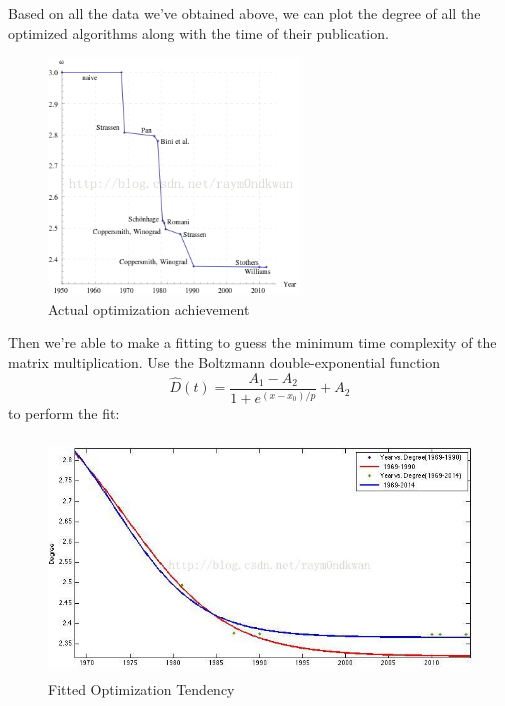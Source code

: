 \documentclass[UTF8]{ctexart}
\begin{document}
Based on all the data we've obtained above, we can plot the degree of all the optimized algorithms along with the time of their publication.
\begin{figure}[htb]
  \begin{center}
    \includegraphics[height=6.3cm]{tend.png}
    \caption{Actual optimization achievement}
  \end{center}
\end{figure}
Then we're able to make a fitting to guess the minimum time complexity of the matrix multiplication. Use the Boltzmann double-exponential function
\begin{equation}
  \hat{D}(t)=\frac{A_{1}-A_{2}}{1+e^{(x-x_{0})/p}}+A_{2}
\end{equation}
to perform the fit:
\begin{figure}[htb]
  \begin{center}
    \includegraphics[height=6.3cm]{tend-fit.png}
    \caption{Fitted Optimization Tendency}
  \end{center}
\end{figure}
\end{document}
